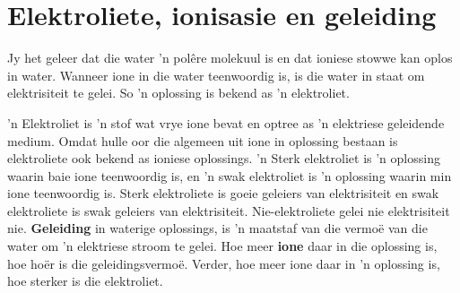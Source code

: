     \label{m38720*cid7}
            \section{Elektroliete, ionisasie en geleiding}
            \nopagebreak
      \label{m38720*id338608}Jy het geleer dat die water  'n polêre molekuul is en dat ioniese stowwe kan oplos in water.
Wanneer ione in die water teenwoordig is, is die water in staat om elektrisiteit te gelei. So   'n oplossing is bekend as  'n elektroliet.\par 
\label{m38720*fhsst!!!underscore!!!id635}
 { 'n Elektroliet is 'n stof wat vrye ione bevat en optree as  'n elektriese geleidende medium. Omdat hulle oor die algemeen uit ione in oplossing bestaan is elektroliete ook bekend as ioniese oplossings.  } 
 'n Sterk elektroliet is   'n oplossing waarin baie ione teenwoordig is, en 'n swak elektroliet is   'n oplossing waarin min ione teenwoordig is. Sterk elektroliete is goeie geleiers van elektrisiteit en swak elektroliete is swak geleiers van elektrisiteit. Nie-elektroliete gelei nie elektrisiteit nie.
\textbf{Geleiding} in waterige oplossings, is  'n maatstaf van die vermoë van die water om   'n elektriese stroom te gelei. Hoe meer \textbf{ione} daar in die oplossing is, hoe hoër is die geleidingsvermoë.  Verder, hoe meer ione daar in  'n oplossing is, hoe sterker is die elektroliet. 
      \label{m38720*uid56}
